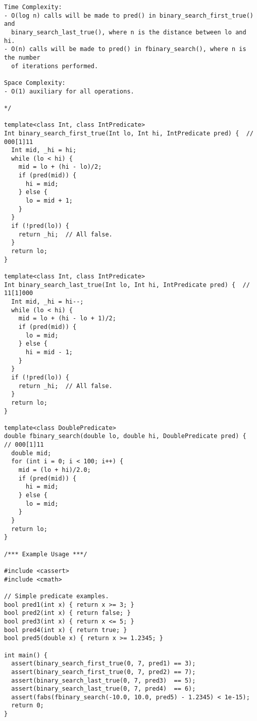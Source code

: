 \begin{lstlisting}
Time Complexity:
- O(log n) calls will be made to pred() in binary_search_first_true() and
  binary_search_last_true(), where n is the distance between lo and hi.
- O(n) calls will be made to pred() in fbinary_search(), where n is the number
  of iterations performed.

Space Complexity:
- O(1) auxiliary for all operations.

*/

template<class Int, class IntPredicate>
Int binary_search_first_true(Int lo, Int hi, IntPredicate pred) {  // 000[1]11
  Int mid, _hi = hi;
  while (lo < hi) {
    mid = lo + (hi - lo)/2;
    if (pred(mid)) {
      hi = mid;
    } else {
      lo = mid + 1;
    }
  }
  if (!pred(lo)) {
    return _hi;  // All false.
  }
  return lo;
}

template<class Int, class IntPredicate>
Int binary_search_last_true(Int lo, Int hi, IntPredicate pred) {  // 11[1]000
  Int mid, _hi = hi--;
  while (lo < hi) {
    mid = lo + (hi - lo + 1)/2;
    if (pred(mid)) {
      lo = mid;
    } else {
      hi = mid - 1;
    }
  }
  if (!pred(lo)) {
    return _hi;  // All false.
  }
  return lo;
}

template<class DoublePredicate>
double fbinary_search(double lo, double hi, DoublePredicate pred) {  // 000[1]11
  double mid;
  for (int i = 0; i < 100; i++) {
    mid = (lo + hi)/2.0;
    if (pred(mid)) {
      hi = mid;
    } else {
      lo = mid;
    }
  }
  return lo;
}

/*** Example Usage ***/

#include <cassert>
#include <cmath>

// Simple predicate examples.
bool pred1(int x) { return x >= 3; }
bool pred2(int x) { return false; }
bool pred3(int x) { return x <= 5; }
bool pred4(int x) { return true; }
bool pred5(double x) { return x >= 1.2345; }

int main() {
  assert(binary_search_first_true(0, 7, pred1) == 3);
  assert(binary_search_first_true(0, 7, pred2) == 7);
  assert(binary_search_last_true(0, 7, pred3)  == 5);
  assert(binary_search_last_true(0, 7, pred4)  == 6);
  assert(fabs(fbinary_search(-10.0, 10.0, pred5) - 1.2345) < 1e-15);
  return 0;
}
\end{lstlisting}
